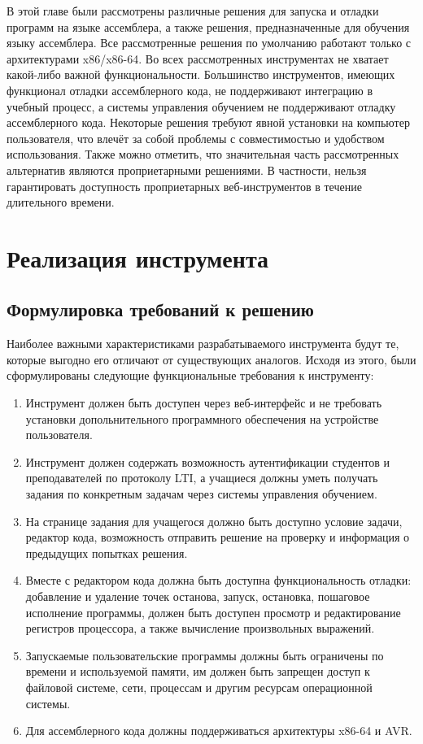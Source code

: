 \documentclass[a4paper,article,14pt]{extarticle}
\begin{document}
В этой главе были рассмотрены различные решения для запуска и отладки программ на языке ассемблера, а также решения, предназначенные для обучения языку ассемблера. Все рассмотренные решения по умолчанию работают только с архитектурами x86/x86-64. Во всех рассмотренных инструментах не хватает какой-либо важной функциональности. Большинство инструментов, имеющих функционал отладки ассемблерного кода, не поддерживают интеграцию в учебный процесс, а системы управления обучением не поддерживают отладку ассемблерного кода. Некоторые решения требуют явной установки на компьютер пользователя, что влечёт за собой проблемы с совместимостью и удобством использования. Также можно отметить, что значительная часть рассмотренных альтернатив являются проприетарными решениями. В частности, нельзя гарантировать доступность проприетарных веб-инструментов в течение длительного времени.

\pagebreak
\section{Реализация инструмента}

\subsection{Формулировка требований к решению}

Наиболее важными характеристиками разрабатываемого инструмента будут те, которые выгодно его отличают от существующих аналогов. Исходя из этого, были сформулированы следующие функциональные требования к инструменту:

\begin{enumerate}
    \item Инструмент должен быть доступен через веб-интерфейс и не требовать установки допольнительного программного обеспечения на устройстве пользователя.
    \item Инструмент должен содержать возможность аутентификации студентов и преподавателей по протоколу LTI, а учащиеся должны уметь получать задания по конкретным задачам через системы управления обучением.
    \item На странице задания для учащегося должно быть доступно условие задачи, редактор кода, возможность отправить решение на проверку и информация о предыдущих попытках решения.
    \item Вместе с редактором кода должна быть доступна функциональность отладки: добавление и удаление точек останова, запуск, остановка, пошаговое исполнение программы, должен быть доступен просмотр и редактирование регистров процессора, а также вычисление произвольных выражений.
    \item Запускаемые пользовательские программы должны быть ограничены по времени и используемой памяти, им должен быть запрещен доступ к файловой системе, сети, процессам и другим ресурсам операционной системы.
    \item Для ассемблерного кода должны поддерживаться архитектуры x86-64 и AVR.
\end{enumerate}
\end{document}
